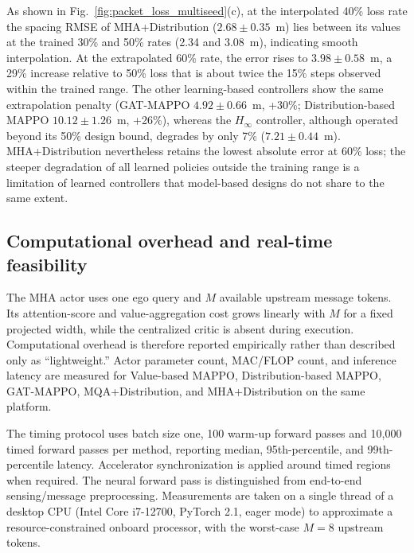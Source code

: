 \documentclass{ieeeaccess}
\begin{document}
As shown in Fig.~\ref{fig:packet_loss_multiseed}(c), at the interpolated 40\% loss rate the spacing RMSE of MHA+Distribution ($2.68\pm0.35$~m) lies between its values at the trained 30\% and 50\% rates (2.34 and 3.08~m), indicating smooth interpolation. At the extrapolated 60\% rate, the error rises to $3.98\pm0.58$~m, a 29\% increase relative to 50\% loss that is about twice the 15\% steps observed within the trained range. The other learning-based controllers show the same extrapolation penalty (GAT-MAPPO $4.92\pm0.66$~m, +30\%; Distribution-based MAPPO $10.12\pm1.26$~m, +26\%), whereas the $H_\infty$ controller, although operated beyond its 50\% design bound, degrades by only 7\% ($7.21\pm0.44$~m). MHA+Distribution nevertheless retains the lowest absolute error at 60\% loss; the steeper degradation of all learned policies outside the training range is a limitation of learned controllers that model-based designs do not share to the same extent. %

\subsection{Computational overhead and real-time feasibility}
\label{sec:computation}

The MHA actor uses one ego query and $M$ available upstream message tokens. Its attention-score and value-aggregation cost grows linearly with $M$ for a fixed projected width, while the centralized critic is absent during execution. Computational overhead is therefore reported empirically rather than described only as ``lightweight.'' Actor parameter count, MAC/FLOP count, and inference latency are measured for Value-based MAPPO, Distribution-based MAPPO, GAT-MAPPO, MQA+Distribution, and MHA+Distribution on the same platform.

The timing protocol uses batch size one, 100 warm-up forward passes and 10,000 timed forward passes per method, reporting median, 95th-percentile, and 99th-percentile latency. Accelerator synchronization is applied around timed regions when required. The neural forward pass is distinguished from end-to-end sensing/message preprocessing. Measurements are taken on a single thread of a desktop CPU (Intel Core i7-12700, PyTorch 2.1, eager mode) to approximate a resource-constrained onboard processor, with the worst-case $M=8$ upstream tokens. %
\end{document}
